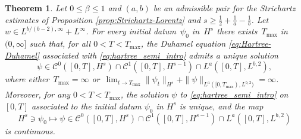 \documentclass[12pt]{article}
\theoremstyle{plain}
\newtheorem{theo}{Theorem}[section]
\begin{document}
	\begin{theo}\label{th: local_with_Strichartz}
	    Let $0\le\beta\le1$ and $(a,b)$ be an admissible pair for the Strichartz estimates of Proposition \ref{prop:Strichartz-Lorentz} and $s\ge\frac12+\frac1a-\frac1b$. Let $w\in L^{b/(b-2),\infty}+L^\infty$. For every initial datum~$\psi_{0}$ in~$H^{s}$ there exists~$T_{\max}$ in~$(0,\infty]$ such that, for all $0<T<T_{\max}$, the Duhamel equation \eqref{eq:Hartree-Duhamel}
associated with \eqref{eq:hartree_semi_intro} admits a unique solution 
\begin{equation*}
\psi\in\mathcal{C}^{0}([0,T],H^{s})\cap \mathcal{C}^{1}([0,T],H^{s-1})\cap L^a([0,T],L^{b,2}),
\end{equation*}
where either~$T_{\max}=\infty$ or~$\lim_{t\to T_{\max}}\|\psi_t\|_{H^s}+\|\psi\|_{L^a([0,T_{\max}),L^{b,2})} = \infty$. Moreover, for any $0<T<T_{\max}$, the solution $\psi$ to \eqref{eq:hartree_semi_intro} on $[0,T]$ associated to the initial datum $\psi_0$ in $H^s$ is unique, and the map
\begin{equation*}
    H^s\ni\psi_0\mapsto\psi\in\mathcal{C}^{0}([0,T],H^{s})\cap \mathcal{C}^{1}([0,T],H^{s-1})\cap L^a([0,T],L^{b,2})
\end{equation*}
is continuous.
	\end{theo}
	
\end{document}
